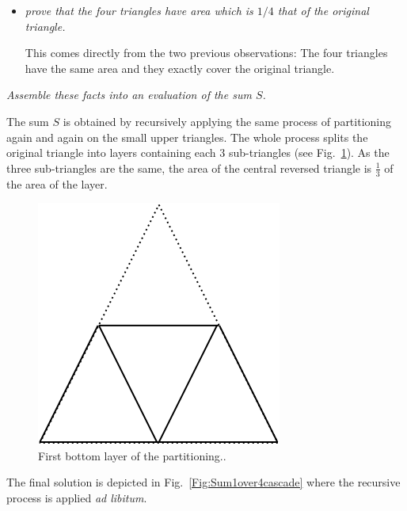 \begin{itemize}
\begin{itemize}
\item
{\em prove that the four triangles have area which is $1/4$ that of the original triangle.}

This comes directly from the two previous observations: The four triangles have the same area
and they exactly cover the original triangle. 
\end{itemize}

{\em Assemble these facts into an evaluation of the sum $S$.}
\smallskip

The sum $S$ is obtained by recursively applying the same process of partitioning again and again
on the small upper triangles. 
The whole process splits the original triangle into layers containing each $3$ sub-triangles
(see Fig.~\ref{Fig:Sum1over4FirstLayer}). 
As the three sub-triangles are the same, the area of the central reversed triangle is $\frac{1}{3}$ of the area of the layer. 
\begin{figure}
\begin{center}
        \includegraphics[scale=0.3]{FiguresMaths/Sum1over4FirstLayer}
        \caption{First bottom layer of the partitioning..}
        \label{Fig:Sum1over4FirstLayer}
\end{center}
\end{figure}

The final solution is depicted in Fig.~\ref{Fig:Sum1over4cascade} where the recursive process is applied \textit{ad libitum}. 


\end{itemize}
